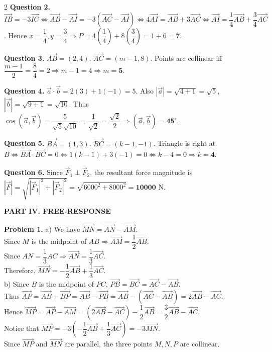 \documentclass[10pt,a4paper]{article}
\begin{document}
\begin{multicols}{2}
\textbf{Question 2.} $\vec{IB} = -3\vec{IC} \Leftrightarrow \vec{AB} - \vec{AI} = -3(\vec{AC} - \vec{AI}) \Leftrightarrow 4\vec{AI} = \vec{AB} + 3\vec{AC} \Leftrightarrow \vec{AI} = \dfrac{1}{4}\vec{AB} + \dfrac{3}{4}\vec{AC}$. Hence $x = \dfrac{1}{4}, y = \dfrac{3}{4} \Rightarrow P = 4\left(\dfrac{1}{4}\right) + 8\left(\dfrac{3}{4}\right) = 1 + 6 = \mathbf{7}$.

\textbf{Question 3.} $\vec{AB} = (2, 4)$, $\vec{AC} = (m - 1, 8)$. Points are collinear iff $\dfrac{m - 1}{2} = \dfrac{8}{4} = 2 \Rightarrow m - 1 = 4 \Rightarrow m = \mathbf{5}$.

\textbf{Question 4.} $\vec{a} \cdot \vec{b} = 2(3) + 1(-1) = 5$. Also $|\vec{a}| = \sqrt{4+1} = \sqrt{5}$, $|\vec{b}| = \sqrt{9+1} = \sqrt{10}$. Thus $\cos(\vec{a}, \vec{b}) = \dfrac{5}{\sqrt{5}\sqrt{10}} = \dfrac{1}{\sqrt{2}} = \dfrac{\sqrt{2}}{2} \Rightarrow (\vec{a}, \vec{b}) = \mathbf{45}^\circ$.

\textbf{Question 5.} $\vec{BA} = (1, 3)$, $\vec{BC} = (k - 1, -1)$. Triangle is right at $B \Leftrightarrow \vec{BA} \cdot \vec{BC} = 0 \Leftrightarrow 1(k - 1) + 3(-1) = 0 \Leftrightarrow k - 4 = 0 \Rightarrow k = \mathbf{4}$.

\textbf{Question 6.} Since $\vec{F}_1 \perp \vec{F}_2$, the resultant force magnitude is $|\vec{F}| = \sqrt{|\vec{F}_1|^2 + |\vec{F}_2|^2} = \sqrt{6000^2 + 8000^2} = \mathbf{10000}\text{ N}$.

\textbf{\color{accent}PART IV. FREE-RESPONSE}

\textbf{Problem 1.}
a) We have $\vec{MN} = \vec{AN} - \vec{AM}$.\\
Since $M$ is the midpoint of $AB \Rightarrow \vec{AM} = \dfrac{1}{2}\vec{AB}$.\\
Since $AN = \dfrac{1}{3}AC \Rightarrow \vec{AN} = \dfrac{1}{3}\vec{AC}$.\\
Therefore, $\vec{MN} = -\dfrac{1}{2}\vec{AB} + \dfrac{1}{3}\vec{AC}$.\\
b) Since $B$ is the midpoint of $PC$, $\vec{PB} = \vec{BC} = \vec{AC} - \vec{AB}$.\\
Thus $\vec{AP} = \vec{AB} + \vec{BP} = \vec{AB} - \vec{PB} = \vec{AB} - (\vec{AC} - \vec{AB}) = 2\vec{AB} - \vec{AC}$.\\
Hence $\vec{MP} = \vec{AP} - \vec{AM} = (2\vec{AB} - \vec{AC}) - \dfrac{1}{2}\vec{AB} = \dfrac{3}{2}\vec{AB} - \vec{AC}$.\\
Notice that $\vec{MP} = -3\left(-\dfrac{1}{2}\vec{AB} + \dfrac{1}{3}\vec{AC}\right) = -3\vec{MN}$.\\
Since $\vec{MP}$ and $\vec{MN}$ are parallel, the three points $M, N, P$ are collinear.


\end{multicols}
\end{document}
